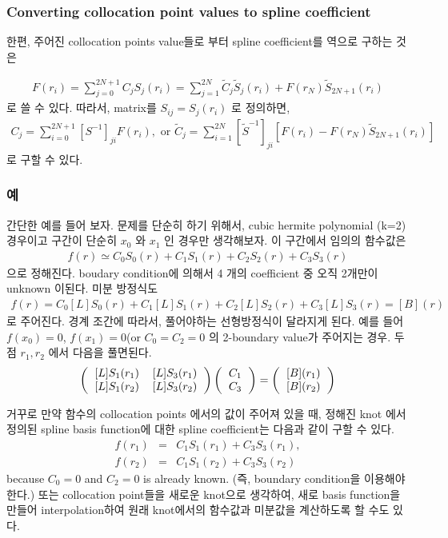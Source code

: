 \documentclass[10pt]{book}
\newcommand{\bea}{\begin{eqnarray}}
\newcommand{\eea}{\end{eqnarray}}
\newcommand{\no}{\nonumber \\}
\begin{document}
\subsubsection{Converting collocation point values to spline coefficient}

한편, 주어진 collocation points value들로 부터 spline coefficient를 역으로
구하는 것은

\bea
F(r_i)=\sum_{j=0}^{2N+1} C_j S_j(r_i)
      =\sum_{j=1}^{2N} \tilde{C}_j \tilde{S}_j(r_i) 
                     +F(r_N)\tilde{S}_{2N+1}(r_i)
\eea 
로 쓸 수 있다. 따라서, matrix를
$S_{ij}=S_j(r_i)$ 로 정의하면,
\bea
C_j=\sum_{i=0}^{2N+1} [S^{-1}]_{ji} F(r_i),\mbox{ or }
\tilde{C}_j=\sum_{i=1}^{2N}[\tilde{S}^{-1}]_{ji}
                [F(r_i)-F(r_N)\tilde{S}_{2N+1}(r_i)]
\eea
로 구할 수 있다.

\subsubsection{예}
간단한 예를 들어 보자. 문제를 단순히 하기 위해서, cubic hermite polynomial (k=2)
경우이고 구간이 단순히 $x_0$ 와 $x_1$ 인 경우만 생각해보자. 이 구간에서
임의의 함수값은
\bea
f(r)\simeq C_0 S_0(r)+C_1 S_1(r)+C_2 S_2(r)+C_3 S_3(r)
\eea
으로 정해진다. boudary condition에 의해서 4 개의 coefficient 중 오직 
2개만이 unknown 이된다. 미분 방정식도
\bea
[L]f(r)=C_0 [L]S_0(r)+ C_1[L]S_1(r)+ C_2 [L]S_2(r)+ C_3 [L] S_3(r)=[B](r)
\eea
로 주어진다. 경계 조간에 따라서, 풀어야하는 선형방정식이 달라지게 된다.
예를 들어 $f(x_0)=0$, $f(x_1)=0$(or $C_0=C_2=0$ 
의 2-boundary value가 주어지는 경우.
두 점 $r_1, r_2$ 에서 다음을 풀면된다.
\begin{equation}
\left(\begin{tabular}{cc} $[L]S_1(r_1)$ & $[L]S_3(r_1)$ \\
                          $[L]S_1(r_2)$ & $[L]S_3(r_2)$ \end{tabular}
\right)\left( \begin{tabular}{c} $C_1$ \\ $C_3$ \end{tabular}\right)
=\left( \begin{tabular}{c} $[B](r_1)$ \\ $[B](r_2)$ \end{tabular}\right)
\end{equation}

거꾸로 만약 함수의 collocation points 에서의 값이 주어져 있을 때,
정해진 knot 에서 정의된 spline basis function에 대한 
spline coefficient는 다음과 같이 구할 수 있다.
\bea
f(r_1)&=& C_1 S_1(r_1)+ C_3 S_3(r_1),\no
f(r_2)&=& C_1 S_1(r_2)+ C_3 S_3(r_2)
\eea
because $C_0=0$ and $C_2=0$ is already known. (즉, boundary condition을 이용해야한다.)
또는 collocation point들을 새로운 knot으로 생각하여, 새로 basis function을 만들어
interpolation하여 원래 knot에서의 함수값과 미분값을 계산하도록 할 수도 있다. 
\end{document}
